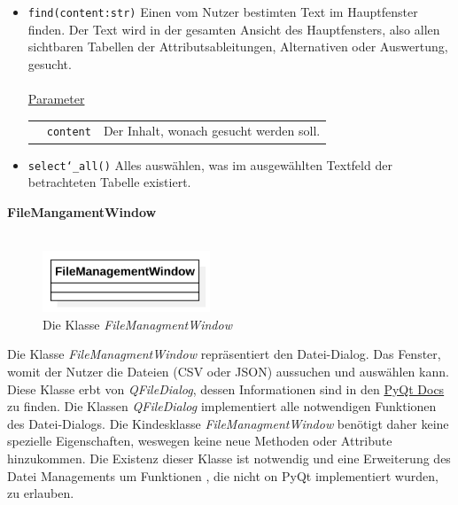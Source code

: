 \documentclass{article}
\begin{document}
\begin{itemize}
\item \texttt{find(content:str)} \newline Einen vom Nutzer bestimten Text im Hauptfenster finden. Der Text wird in der gesamten Ansicht des Hauptfensters, also allen sichtbaren Tabellen der Attributsableitungen, Alternativen oder Auswertung, gesucht.
\\\\
\underline{{Parameter}}\\
\begin{tabular}{lll}
 & \texttt{content} & Der Inhalt, wonach gesucht werden soll. \\
\end{tabular}

\item \texttt{select\char`_all()} \newline Alles auswählen, was im ausgewählten Textfeld der betrachteten Tabelle existiert.
\end{itemize}

\newpage
\textbf{\large{FileMangamentWindow}}\\\\
\begin{figure}[H]%
    \centering
    \includegraphics[width=5cm]{entwurf/Entwurf_dokument/img/klassenView/FileManagementWindow.png}
    \caption{Die Klasse \textit{FileManagmentWindow}}
\end{figure}
Die Klasse \textit{FileManagmentWindow} repräsentiert den Datei-Dialog. Das Fenster, womit der Nutzer die Dateien (CSV oder JSON) aussuchen und auswählen kann. Diese Klasse erbt von \textit{QFileDialog}, dessen Informationen sind in den \href{https://doc.qt.io/qtforpython-5/PySide2/QtWidgets/QFileDialog.html}{PyQt Docs} zu finden. Die Klassen \textit{QFileDialog} implementiert alle notwendigen Funktionen des Datei-Dialogs. Die Kindesklasse \textit{FileManagmentWindow} benötigt daher keine spezielle Eigenschaften, weswegen keine neue Methoden oder Attribute hinzukommen. Die Existenz dieser Klasse ist notwendig und eine Erweiterung des Datei Managements um Funktionen , die nicht on PyQt implementiert wurden, zu erlauben.
\newline \newline
\end{document}
